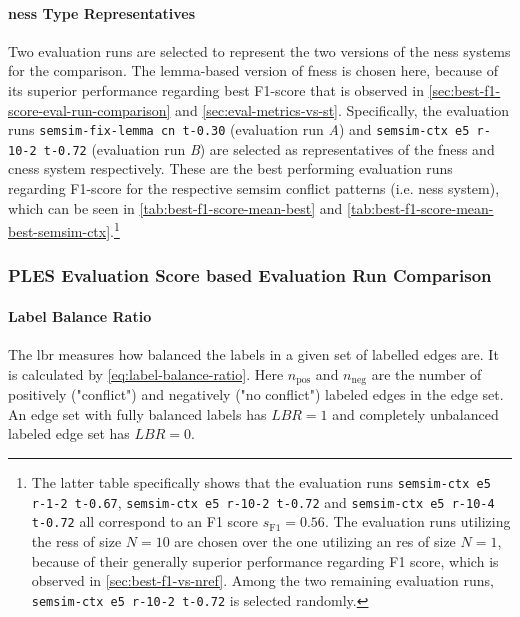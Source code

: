 \documentclass[11pt]{scrreprt}
\begin{document}
{\paragraph{\gls{ness} Type Representatives}
Two evaluation runs are selected to represent the two versions of the \gls{ness} systems for the comparison. The lemma-based version of \gls{fness} is chosen here, because of its superior performance regarding best F1-score that is observed in \cref{sec:best-f1-score-eval-run-comparison} and \cref{sec:eval-metrics-vs-st}. Specifically, the evaluation runs \texttt{semsim-fix-lemma cn t-0.30} (evaluation run \textit{A}) and \texttt{semsim-ctx e5 r-10-2 t-0.72} (evaluation run \textit{B}) are selected as representatives of the \gls{fness} and \gls{cness} system respectively. These are the best performing evaluation runs regarding F1-score for the respective semsim conflict patterns (i.e. \gls{ness} system), which can be seen in \cref{tab:best-f1-score-mean-best} and \cref{tab:best-f1-score-mean-best-semsim-ctx}.\footnote{
The latter table specifically shows that the evaluation runs \texttt{semsim-ctx e5 r-1-2 t-0.67}, \texttt{semsim-ctx e5 r-10-2 t-0.72} and \texttt{semsim-ctx e5 r-10-4 t-0.72} all correspond to an F1 score \(s_\text{F1} = 0.56\). The evaluation runs utilizing the \gls{res}s of size \(N = 10\) are chosen over the one utilizing an \gls{res} of size \(N = 1\), because of their generally superior performance regarding F1 score, which is observed in \cref{sec:best-f1-vs-nref}. Among the two remaining evaluation runs, \texttt{semsim-ctx e5 r-10-2 t-0.72} is selected randomly.



}

\subsubsection{PLES Evaluation Score based Evaluation Run Comparison}

\paragraph{Label Balance Ratio}
The \gls{lbr} measures how balanced the labels in a given set of labelled edges are. It is calculated by \cref{eq:label-balance-ratio}. Here \(n_\text{pos}\) and \(n_\text{neg}\) are the number of positively ("conflict") and negatively ("no conflict") labeled edges in the edge set.
An edge set with fully balanced labels has \(LBR = 1\) and completely unbalanced labeled edge set has \(LBR = 0\).

}
\end{document}
